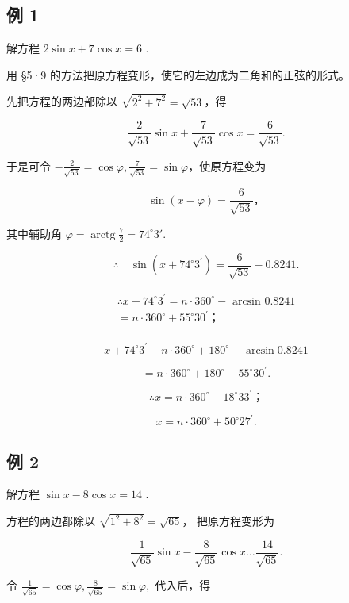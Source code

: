 \subsection{例 1}

解方程 \(2\sin x + 7\cos x = 6\) .

 用 §5·9
的方法把原方程变形，使它的左边成为二角和的正弦的形式。

先把方程的两边部除以 \(\sqrt{2^2 + 7^2} = \sqrt{53}\)，得

\[
\frac {2}{\sqrt {53}} \sin x + \frac {7}{\sqrt {53}} \cos x = \frac {6}{\sqrt {53}}.
\]

于是可令
\(-\frac{2}{\sqrt{53}} = \cos \varphi, \frac{7}{\sqrt{53}} = \sin \varphi\)，使原方程变为

\[
\sin (x - \varphi) = \frac {6}{\sqrt {53}}\text{，}
\]

其中辅助角
\(\varphi = \operatorname{arctg} \frac{7}{2} = 74^{\circ}3'\).

\[
\therefore \quad \sin (x + 74 ^{\circ} 3 ^{\prime}) = \frac {6}{\sqrt {53}} - 0.8241.
\]

\[
\begin{array}{l} \therefore x + 74 ^{\circ} 3 ^{\prime} = n \cdot 360 ^{\circ} - \text { arcsin } 0.8241 \\ = n \cdot 360 ^{\circ} + 55 ^{\circ} 30 ^{\prime}\text{；} \\ \end{array}
\]

\[
x + 74 ^{\circ} 3 ^{\prime} - n \cdot 360 ^{\circ} + 180 ^{\circ} - \arcsin 0.8241
\]

\[
= n \cdot 360 ^{\circ} + 180 ^{\circ} - 55 ^{\circ} 30 ^{\prime}.
\]

\[
\therefore x = n \cdot 360 ^{\circ} - 18 ^{\circ} 33 ^{\prime}\text{；}
\]

\[
x = n \cdot 360 ^{\circ} + 50 ^{\circ} 27 ^{\prime}.
\]

\subsection{例 2}

解方程 \(\sin x - 8 \cos x = 14\) .

 方程的两边都除以 \(\sqrt{1^2 + 8^2} = \sqrt{65}\)，
把原方程变形为

\[
\frac {1}{\sqrt {65}} \sin x - \frac {8}{\sqrt {65}} \cos x \dots \frac {14}{\sqrt {65}}.
\]

令
\(\frac{1}{\sqrt{65}} = \cos \varphi, \frac{8}{\sqrt{65}} = \sin \varphi,\)
代入后，得

